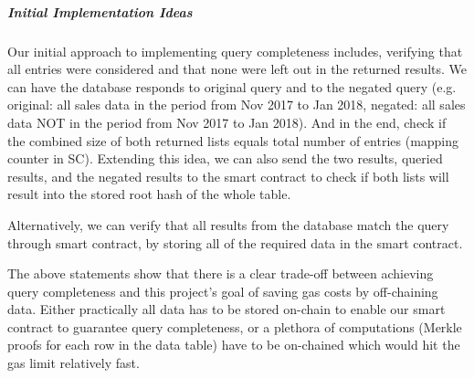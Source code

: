 \subparagraph{Initial Implementation Ideas}

Our initial approach to implementing query completeness includes, verifying that all entries were considered and that none were left out in the returned results. We can have the database responds to original query and to the negated query (e.g. original: all sales data in the period from Nov 2017 to Jan 2018, negated: all sales data NOT in the period from Nov 2017 to Jan 2018). And in the end, check if the combined size of both returned lists equals total number of entries (mapping counter in SC). Extending this idea, we can also send the two results, queried results, and the negated results to the smart contract to check if both lists will result into the stored root hash of the whole table.

Alternatively, we can verify that all results from the database match the query through smart contract, by storing all of the required data in the smart contract. 



The above statements show that there is a clear trade-off between achieving query completeness and this project’s goal of saving gas costs by off-chaining data. Either practically all data has to be stored on-chain to enable our smart contract to guarantee query completeness, or a plethora of computations (Merkle proofs for each row in the data table) have to be on-chained which would hit the gas limit relatively fast.

